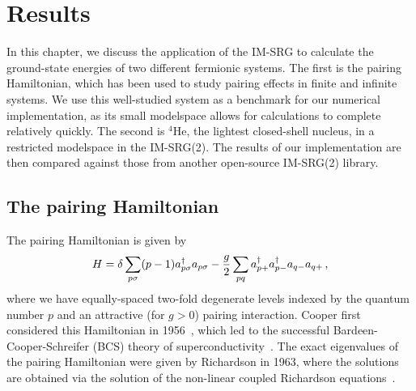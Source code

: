 \chapter{Results}\label{ch:results}

In this chapter, we discuss the application of the IM-SRG
to calculate the ground-state energies of two different fermionic systems.
The first is the pairing Hamiltonian,
which has been used to study pairing effects in finite and infinite systems.
We use this well-studied system as a benchmark for our numerical implementation,
as its small modelspace allows for calculations to complete relatively quickly.
The second is ${}^4\text{He}$,
the lightest closed-shell nucleus,
in a restricted modelspace in the IM-SRG(2).
The results of our implementation are then compared
against those from another open-source IM-SRG(2) library.

\section{The pairing Hamiltonian}

The pairing Hamiltonian is given by
\begin{equation}\label{eq:pairing_hamiltonian}
  H = \delta \sum_{p\sigma} (p - 1) a_{p\sigma}^{\dagger} a_{p\sigma}
  - \frac{g}{2} \sum_{p q} a_{p+}^{\dagger}a_{p-}^{\dagger} a_{q-} a_{q+}\,,
\end{equation}
where we have equally-spaced two-fold degenerate levels indexed by the quantum number $p$
and an attractive (for $g > 0$) pairing interaction.
Cooper first considered this Hamiltonian in 1956~\cite{Coop56pairing_hamiltonian},
which led to the successful Bardeen-Cooper-Schreifer (BCS) theory of superconductivity~\cite{Bard57bcs}.
The exact eigenvalues of the pairing Hamiltonian were given by Richardson in 1963,
where the solutions are obtained via the solution of the non-linear coupled Richardson equations~\cite{Rich63pairing_hamiltonian}.

